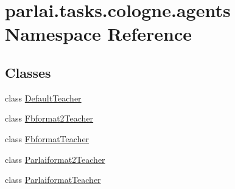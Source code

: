 \hypertarget{namespaceparlai_1_1tasks_1_1cologne_1_1agents}{}\section{parlai.\+tasks.\+cologne.\+agents Namespace Reference}
\label{namespaceparlai_1_1tasks_1_1cologne_1_1agents}
\subsection*{Classes}
\begin{DoxyCompactItemize}
\item 
class \hyperlink{classparlai_1_1tasks_1_1cologne_1_1agents_1_1DefaultTeacher}{Default\+Teacher}
\item 
class \hyperlink{classparlai_1_1tasks_1_1cologne_1_1agents_1_1Fbformat2Teacher}{Fbformat2\+Teacher}
\item 
class \hyperlink{classparlai_1_1tasks_1_1cologne_1_1agents_1_1FbformatTeacher}{Fbformat\+Teacher}
\item 
class \hyperlink{classparlai_1_1tasks_1_1cologne_1_1agents_1_1Parlaiformat2Teacher}{Parlaiformat2\+Teacher}
\item 
class \hyperlink{classparlai_1_1tasks_1_1cologne_1_1agents_1_1ParlaiformatTeacher}{Parlaiformat\+Teacher}
\end{DoxyCompactItemize}
